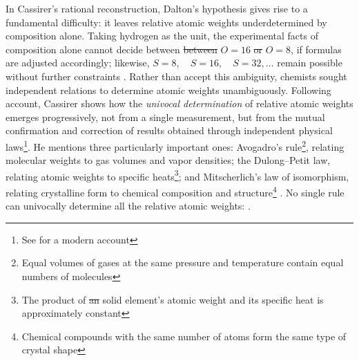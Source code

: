 \documentclass[submitted,12pt]{article}
\providecommand{\DIFadd}[1]{{\protect\color{blue}\uwave{#1}}} %
\providecommand{\DIFdel}[1]{{\protect\color{red}\sout{#1}}}                      %
\providecommand{\DIFaddbegin}{} %
\providecommand{\DIFaddend}{} %
\providecommand{\DIFdelbegin}{} %
\providecommand{\DIFdelend}{} %
\begin{document}
In Cassirer's rational reconstruction, Dalton's hypothesis gives rise to a fundamental difficulty: it leaves relative atomic weights underdetermined by composition alone. Taking hydrogen as the unit, the experimental facts of composition alone cannot decide between \DIFdelbegin \DIFdel{between }\DIFdelend $O=16$ \DIFdelbegin \DIFdel{or }\DIFdelend \DIFaddbegin \DIFadd{and }\DIFaddend $O=8$, if formulas are adjusted accordingly; likewise, $S=8, \quad S=16, \quad S=32, \ldots$ remain possible without further constraints . Rather than accept this ambiguity, chemists sought independent relations to determine atomic weights unambiguously. Following  account, Cassirer shows how the \emph{univocal determination} of relative atomic weights emerges progressively, not from a single measurement, but from the mutual confirmation and correction of results obtained through independent physical laws\footnote{See \cite{Norton2024} for a modern account\DIFaddbegin \DIFadd{.}\DIFaddend }. He mentions three particularly important ones: Avogadro's rule\footnote{Equal volumes of gases at the same pressure and temperature contain equal numbers of molecules\DIFaddbegin \DIFadd{.}\DIFaddend {}}, relating molecular weights to gas volumes and vapor densities; the Dulong--Petit law, relating atomic weights to specific heats\footnote{The product of \DIFdelbegin \DIFdel{an }\DIFdelend \DIFaddbegin \DIFadd{a }\DIFaddend solid element's atomic weight and its specific heat is approximately constant\DIFaddbegin \DIFadd{.}\DIFaddend {}}; and Mitscherlich's law of isomorphism, relating crystalline form to chemical composition and structure\footnote{Chemical compounds with the same number of atoms form the same type of crystal shape\DIFaddbegin \DIFadd{.}\DIFaddend } . No single rule can univocally determine all the relative atomic weights:  .
\end{document}
